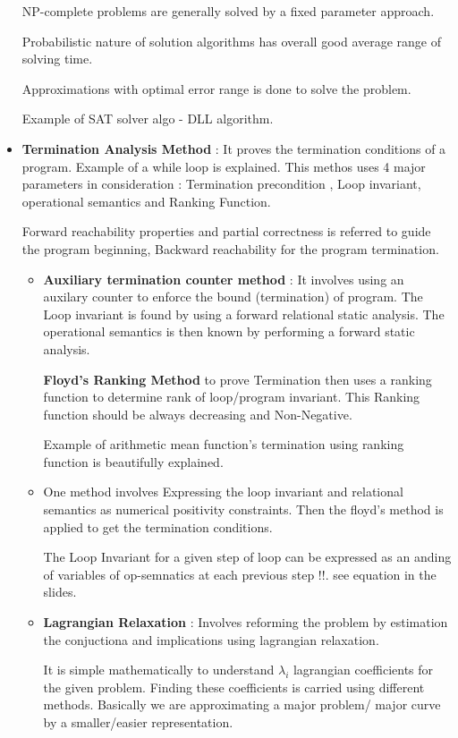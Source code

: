 \begin{itemize}
{\begin{itemize}
{		NP-complete problems are generally solved by a fixed parameter approach.

		Probabilistic nature of solution algorithms has overall good average range of solving time.

		Approximations with optimal error range is done to solve the problem.

		Example of SAT solver algo - DLL algorithm.	
		}
	\end{itemize}
	}

	\item{\textbf{ Termination Analysis Method} : 
	It proves the termination conditions of  a program. Example of a while loop is explained. This methos uses 4 major parameters in consideration : Termination precondition , Loop invariant, operational semantics and Ranking Function.

	Forward reachability properties and partial correctness is referred to guide the program beginning, Backward reachability for the program termination. 
	

	\begin{itemize}
	\item{\textbf{Auxiliary termination counter method} : It involves using an auxilary counter to enforce the bound (termination) of program. The Loop invariant is found by using a forward relational static analysis. The operational semantics is then known by performing a forward static analysis.

	\textbf{Floyd's Ranking Method} to prove Termination then uses a ranking function to determine rank of loop/program invariant. This Ranking function should be always decreasing and Non-Negative.

	Example of arithmetic mean function's termination using ranking function is beautifully explained. 
	}
	
	\item{One method involves Expressing the loop invariant and relational semantics as numerical positivity constraints. Then the floyd's method is applied to get the termination conditions. 

	The Loop Invariant for a given step of loop can be expressed as an anding of variables of op-semnatics at each previous step !!. see equation in the slides.
	}

	\item{\textbf{Lagrangian Relaxation} : Involves reforming the problem by estimation the conjuctiona and implications using lagrangian relaxation.

	It is simple mathematically to understand $\lambda _ i$ lagrangian coefficients for the given problem. Finding these coefficients is carried using different methods. Basically we are approximating a major problem/ major curve by a smaller/easier representation.

}
\end{itemize}}
\end{itemize}
